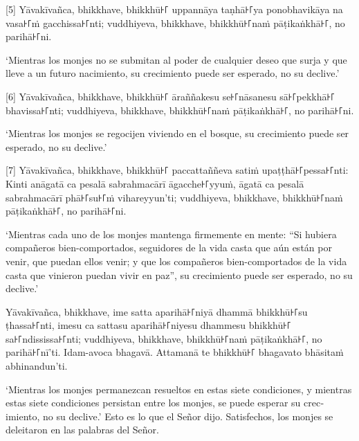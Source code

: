 \enlargethispage{2\baselineskip}

[5] Yāvakīvañca, bhikkhave, bhikkhū꜔꜒ uppannāya taṇhā꜔꜒ya ponobhavikāya na vasa꜔꜒ṁ
gacchissa꜔꜒nti; vuddhiyeva, bhikkhave, bhikkhū꜔꜒naṁ pāṭikaṅkhā꜔꜒, no parihā꜔꜒ni.

\begin{english}
  `Mientras los monjes no se submitan al poder de cualquier deseo que surja y
  que lleve a un futuro nacimiento, su crecimiento puede ser
  esperado, no su declive.'
\end{english}

[6] Yāvakīvañca, bhikkhave, bhikkhū꜔꜒ āraññakesu se꜔꜒nāsanesu sā꜔꜒pekkhā꜔꜒ bhavissa꜔꜒nti;
vuddhiyeva, bhikkhave, bhikkhū꜔꜒naṁ pāṭikaṅkhā꜔꜒, no parihā꜔꜒ni.

\begin{english}
  `Mientras los monjes se regocijen viviendo en el bosque,
  su crecimiento puede ser esperado, no su declive.'
\end{english}

[7] Yāvakīvañca, bhikkhave, bhikkhū꜔꜒ paccattaññeva satiṁ upaṭṭhā꜔꜒pessa꜔꜒nti: Kinti
anāgatā ca pesalā sabrahmacārī āgacche꜔꜒yyuṁ, āgatā ca pesalā sabrahmacārī phā꜔꜒su꜔꜒ṁ
vihareyyun'ti; vuddhiyeva, bhikkhave, bhikkhū꜔꜒naṁ pāṭikaṅkhā꜔꜒, no parihā꜔꜒ni.

\begin{english}
  `Mientras cada uno de los monjes mantenga firmemente en mente: ``Si hubiera
  compañeros bien-comportados, seguidores de la vida casta que aún están por
  venir, que puedan ellos venir; y que los compañeros bien-comportados de la vida casta
  que vinieron puedan vivir en paz'', su crecimiento puede ser esperado, no su declive.'
\end{english}

Yāvakīvañca, bhikkhave, ime satta aparihā꜔꜒niyā dhammā bhikkhū꜔꜒su ṭhassa꜔꜒nti, imesu
ca sattasu aparihā꜔꜒niyesu dhammesu bhikkhū꜔꜒ sa꜔꜒ndississa꜔꜒nti; vuddhiyeva, bhikkhave,
bhikkhū꜔꜒naṁ pāṭikaṅkhā꜔꜒, no parihā꜔꜒nī'ti. Idam-avoca bhagavā. Attamanā te bhikkhū꜔꜒
bhagavato bhāsitaṁ abhinandun'ti.

\begin{english}
  `Mientras los monjes permanezcan resueltos en estas siete condiciones, y mientras
  estas siete condiciones persistan entre los monjes, se puede esperar su
  crecimiento, no su declive.' Esto es lo que el Señor dijo. Satisfechos,
  los monjes se deleitaron en las palabras del Señor.
\end{english}
